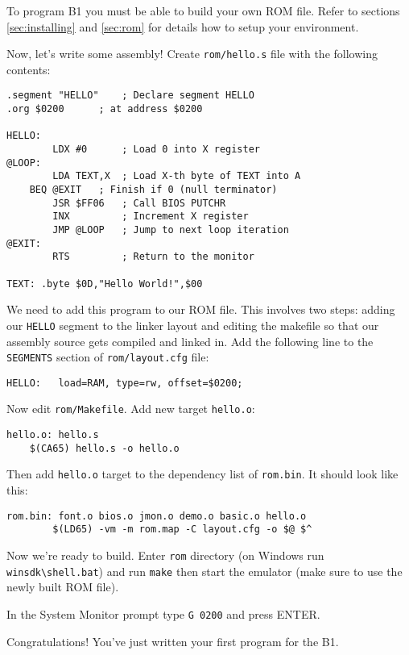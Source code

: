 \documentclass[a4paper,10pt,oneside]{article}
\begin{document}
To program B1 you must be able to build your own ROM file. Refer to sections \ref{sec:installing} and \ref{sec:rom} for details how to setup your environment.

Now, let's write some assembly! Create \texttt{rom/hello.s} file with the following contents:

\begin{lstlisting}[caption=Hello World for B1 in 6502 Assembly]
.segment "HELLO"	; Declare segment HELLO
.org $0200		; at address $0200

HELLO:
        LDX #0		; Load 0 into X register
@LOOP:
        LDA TEXT,X	; Load X-th byte of TEXT into A
	BEQ @EXIT	; Finish if 0 (null terminator)
        JSR $FF06	; Call BIOS PUTCHR
        INX 		; Increment X register
        JMP @LOOP	; Jump to next loop iteration
@EXIT:
        RTS 		; Return to the monitor

TEXT: .byte $0D,"Hello World!",$00
\end{lstlisting}

We need to add this program to our ROM file. This involves two steps: adding our \texttt{HELLO} segment to the linker layout and editing the makefile so that our assembly source gets compiled and linked in. Add the following line to the \texttt{SEGMENTS} section of \texttt{rom/layout.cfg} file:
\begin{lstlisting}[numbers=none]
HELLO:   load=RAM, type=rw, offset=$0200;
\end{lstlisting}

Now edit \texttt{rom/Makefile}. Add new target \texttt{hello.o}:
\begin{lstlisting}[numbers=none]
hello.o: hello.s
	$(CA65) hello.s -o hello.o
\end{lstlisting}

Then add \texttt{hello.o} target to the dependency list of \texttt{rom.bin}. It should look like this:
\begin{lstlisting}[numbers=none]
rom.bin: font.o bios.o jmon.o demo.o basic.o hello.o
        $(LD65) -vm -m rom.map -C layout.cfg -o $@ $^
\end{lstlisting}

Now we're ready to build. Enter \texttt{rom} directory (on Windows run \texttt{winsdk\textbackslash{}shell.bat}) and run \texttt{make} then start the emulator (make sure to use the newly built ROM file).

In the System Monitor prompt type \texttt{G 0200} and press ENTER.

Congratulations! You've just written your first program for the B1.
\end{document}
